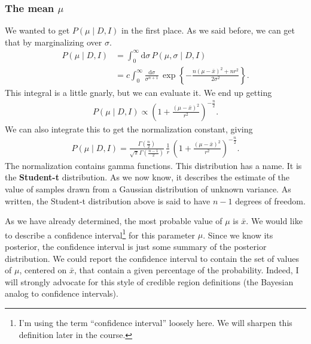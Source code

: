 \subsubsection{The mean $\mu$}
We wanted to get $P(\mu\mid D, I)$ in the first place.  As we said
before, we can get that by marginalizing over $\sigma$.
\begin{align}
P(\mu\mid D, I) &= \int_0^\infty \mathrm{d}\sigma\,P(\mu, \sigma \mid D, I) \\ \nonumber
&= c\int_0^\infty \frac{\mathrm{d}\sigma}{\sigma^{n+1}}\, 
\exp\left\{-\frac{n(\mu - \bar{x})^2 + nr^2}{2\sigma^2}\right\}.
\end{align}
This integral is a little gnarly, but we can evaluate it.  We end up
getting
\begin{align}
P(\mu\mid D, I) \propto \left(1 + \frac{(\mu - \bar{x})^2}{r^2}\right)^{-\frac{n}{2}}.
\end{align}
We can also integrate this to get the normalization constant, giving
\begin{align}
P(\mu\mid D, I) = \frac{\Gamma\left(\frac{n}{2}\right)}{\sqrt{\pi}\Gamma\left(\frac{n-1}{2}\right)}\,\frac{1}{r}\,\left(1 + \frac{(\mu - \bar{x})^2}{r^2}\right)^{-\frac{n}{2}}.
\end{align}
The normalization contains gamma functions.  This distribution has a
name.  It is the \textbf{Student-t} distribution.  As we now know, it
describes the estimate of the value of samples drawn from a Gaussian
distribution of unknown variance.  As written, the Student-t
distribution above is said to have $n-1$ degrees of freedom.

As we have already determined, the most probable value of $\mu$ is
$\bar{x}$.  We would like to describe a confidence
interval\footnote{I'm using the term ``confidence interval'' loosely
  here.  We will sharpen this definition later in the course.} for
this parameter $\mu$.  Since we know its posterior, the confidence
interval is just some summary of the posterior distribution.  We could
report the confidence interval to contain the set of values of $\mu$,
centered on $\bar{x}$, that contain a given percentage of the
probability.  Indeed, I will strongly advocate for this style of
credible region definitions (the Bayesian analog to confidence
intervals).

